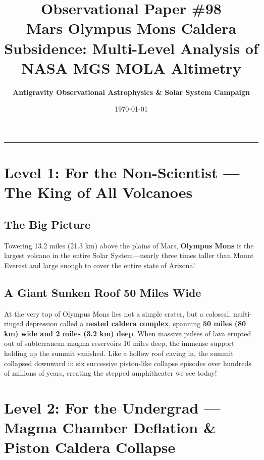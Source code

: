 \documentclass[11pt,a4paper]{article}
\title{\Huge \textbf{Observational Paper \#98}\\ \Large Mars Olympus Mons Caldera Subsidence: Multi-Level Analysis of NASA MGS MOLA Altimetry}
\author{\textbf{Antigravity Observational Astrophysics \& Solar System Campaign}}
\date{\today}
\begin{document}
\maketitle

\vspace{-1em}
\begin{center}
\rule{\textwidth}{1.5pt}
\end{center}

\section*{Level 1: For the Non-Scientist — The King of All Volcanoes}

\subsection*{The Big Picture}
Towering 13.2 miles (21.3 km) above the plains of Mars, \textbf{Olympus Mons} is the largest volcano in the entire Solar System—nearly three times taller than Mount Everest and large enough to cover the entire state of Arizona!

\subsection*{A Giant Sunken Roof 50 Miles Wide}
At the very top of Olympus Mons lies not a simple crater, but a colossal, multi-ringed depression called a \textbf{nested caldera complex}, spanning \textbf{50 miles (80 km) wide and 2 miles (3.2 km) deep}. When massive pulses of lava erupted out of subterranean magma reservoirs 10 miles deep, the immense support holding up the summit vanished. Like a hollow roof caving in, the summit collapsed downward in six successive piston-like collapse episodes over hundreds of millions of years, creating the stepped amphitheater we see today!

\newpage

\section*{Level 2: For the Undergrad — Magma Chamber Deflation \& Piston Caldera Collapse}
\end{document}
